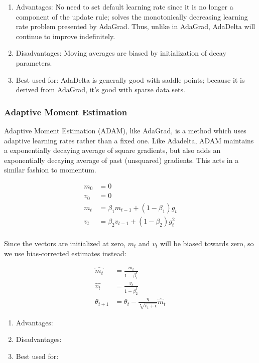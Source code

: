 \documentclass[twoside,11pt]{homework}
\begin{document}
\begin{enumerate}
	\item Advantages: No need to set default learning rate since it is no longer a component of the update rule; solves the monotonically decreasing learning rate problem presented by AdaGrad. Thus, unlike in AdaGrad, AdaDelta will continue to improve indefinitely.
	\item Disadvantages: Moving averages are biased by initialization of decay parameters.
	\item Best used for: AdaDelta is generally good with saddle points; because it is derived from AdaGrad, it's good with sparse data sets.
\end{enumerate}
\subsubsection*{Adaptive Moment Estimation}
Adaptive Moment Estimation (ADAM), like AdaGrad, is a method which uses adaptive learning rates rather than a fixed one. Like Adadelta, ADAM maintains a exponentially decaying average of square gradients, but also adds an exponentially decaying average of past (unsquared) gradients. This acts in a similar fashion to momentum.

\begin{align*}
	m_0 &= 0\\
	v_0 &= 0\\
	m_t &= \beta_1 m_{t-1}+(1-\beta_1)g_t\\
	v_t &= \beta_2 v_{t-1}+(1-\beta_2)g^2_t\\
\end{align*}

Since the vectors are initialized at zero, $m_t$ and $v_t$ will be biased towards zero, so we use bias-corrected estimates instead:

\begin{align*}
	\hat{m_t} &= \frac{m_t}{1-\beta^t_1}\\
	\hat{v_t} &= \frac{v_t}{1-\beta^t_2}\\
	\theta_{t+1} &= \theta_t - \frac{\eta}{\sqrt[•]{\hat{v}_t+\epsilon}}\hat{m}_t
\end{align*}

\begin{enumerate}
	\item Advantages:
	\item Disadvantages:
	\item Best used for:
\end{enumerate}
\end{document}
